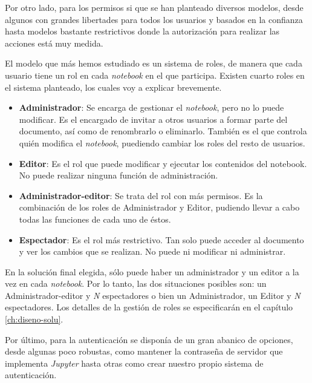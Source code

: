 \documentclass[11pt,spanish,listoffigures]{tfgetsinf}
\begin{document}
Por otro lado, para los permisos si que se han planteado diversos modelos, desde algunos con grandes libertades para todos los usuarios y basados en la confianza hasta modelos bastante restrictivos donde la autorización para realizar las acciones está muy medida.

El modelo que más hemos estudiado es un sistema de roles, de manera que cada usuario tiene un rol en cada \textit{notebook} en el que participa. Existen cuarto roles en el sistema planteado, los cuales voy a explicar brevemente.

\begin{itemize}

\item \textbf{Administrador}: Se encarga de gestionar el \textit{notebook}, pero no lo puede modificar. Es el encargado de invitar a otros usuarios a formar parte del documento, así como de renombrarlo o eliminarlo. También es el que controla quién modifica el \textit{notebook}, puediendo cambiar los roles del resto de usuarios. 

\item \textbf{Editor}: Es el rol que puede modificar y ejecutar los contenidos del notebook. No puede realizar ninguna función de administración.

\item \textbf{Administrador-editor}: Se trata del rol con más permisos. Es la combinación de los roles de Administrador y Editor, pudiendo llevar a cabo todas las funciones de cada uno de éstos.

\item \textbf{Espectador}: Es el rol más restrictivo. Tan solo puede acceder al documento y ver los cambios que se realizan. No puede ni modificar ni administrar.

\end{itemize}

En la solución final elegida, sólo puede haber un administrador y un editor a la vez en cada \textit{notebook}. Por lo tanto, las dos situaciones posibles son: un Administrador-editor y \textit{N} espectadores o bien un Administrador, un Editor y \textit{N} espectadores. Los detalles de la gestión de roles se especificarán en el capítulo \ref{ch:diseno-solu}.

Por último, para la autenticación se disponía de un gran abanico de opciones, desde algunas poco robustas, como mantener la contraseña de servidor que implementa \textit{Jupyter} hasta otras como crear nuestro propio sistema de autenticación.
\end{document}
